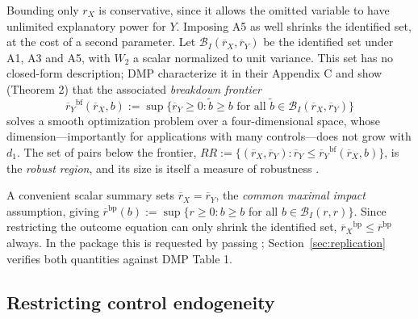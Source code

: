 \documentclass[article]{jss}\usepackage[]{graphicx}\usepackage[]{xcolor}
\newcommand{\rxbar}{\ensuremath{\overline{r}_X}}
\newcommand{\rybar}{\ensuremath{\overline{r}_Y}}
\begin{document}
Bounding only $r_X$ is conservative, since it allows the omitted variable
to have unlimited explanatory power for $Y$. Imposing A5 as well shrinks
the identified set, at the cost of a second parameter. Let
$\mathcal{B}_I(\rxbar, \rybar)$ be the identified set under A1, A3 and A5,
with $W_2$ a scalar normalized to unit variance. This set has no
closed-form description; DMP characterize it in their Appendix C and show
(Theorem 2) that the associated \emph{breakdown frontier}
\begin{equation}
\rybar^{\mathrm{bf}}(\rxbar, b)
:= \sup\{\rybar \ge 0 : \tilde b \ge b \text{ for all }
         \tilde b \in \mathcal{B}_I(\rxbar, \rybar)\}
\label{eq:bf}
\end{equation}
solves a smooth optimization problem over a four-dimensional space, whose
dimension---importantly for applications with many controls---does not grow
with $d_1$. The set of pairs below the frontier,
$RR := \{(\rxbar, \rybar) : \rybar \le \rybar^{\mathrm{bf}}(\rxbar, b)\}$,
is the \emph{robust region}, and its size is itself a measure of
robustness \citep{Masten2020}.

A convenient scalar summary sets $\rxbar = \rybar$, the \emph{common
maximal impact} assumption, giving
$\overline{r}^{\mathrm{bp}}(b) := \sup\{r \ge 0 : b \ge b$ for all
$b \in \mathcal{B}_I(r, r)\}$. Since restricting the outcome equation can
only shrink the identified set,
$\rxbar^{\mathrm{bp}} \le \overline{r}^{\mathrm{bp}}$ always. In the
package this is requested by passing ;
Section~\ref{sec:replication} verifies both quantities against DMP Table 1.

\subsection{Restricting control endogeneity}\label{sec:cbar}
\end{document}
